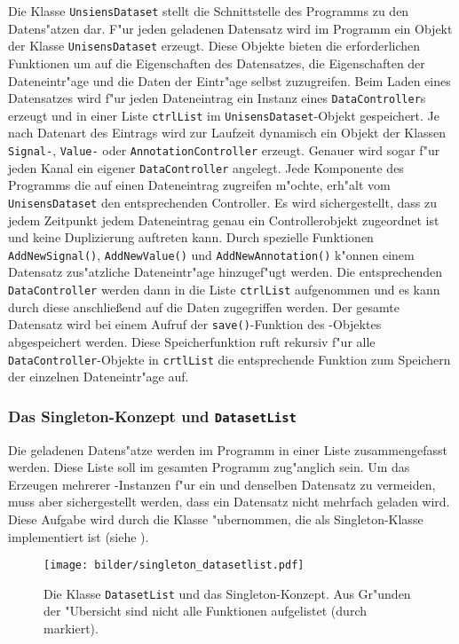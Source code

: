 Die Klasse \verb|UnsiensDataset| stellt die Schnittstelle des Programms zu den Datens"atzen dar.
F"ur jeden geladenen Datensatz wird im Programm ein Objekt der Klasse \verb|UnisensDataset| erzeugt.
Diese Objekte bieten die erforderlichen Funktionen um auf die Eigenschaften des Datensatzes, die Eigenschaften der Dateneintr"age und die Daten der Eintr"age selbst zuzugreifen.
Beim Laden eines Datensatzes wird f"ur jeden Dateneintrag ein Instanz eines \verb|DataController|s erzeugt und in einer Liste \verb|ctrlList| im \verb|UnisensDataset|-Objekt gespeichert.
Je nach Datenart des Eintrags wird zur Laufzeit dynamisch ein Objekt der Klassen \verb|Signal-|, \verb|Value-| oder \verb|AnnotationController| erzeugt.
Genauer wird sogar f"ur jeden Kanal ein eigener \verb|DataController| angelegt.
Jede Komponente des Programms die auf einen Dateneintrag zugreifen m"ochte, erh"alt vom \verb|UnisensDataset| den entsprechenden Controller.
Es wird sichergestellt, dass zu jedem Zeitpunkt jedem Dateneintrag genau ein Controllerobjekt zugeordnet ist und keine Duplizierung auftreten kann.
Durch spezielle Funktionen \verb|AddNewSignal()|, \verb|AddNewValue()| und \verb|AddNewAnnotation()| k"onnen einem Datensatz zus"atzliche Dateneintr"age hinzugef"ugt werden.
Die entsprechenden \verb|DataController| werden dann in die Liste \verb|ctrlList| aufgenommen und es kann durch diese anschlie\ss end auf die Daten zugegriffen werden.
Der gesamte Datensatz wird bei einem Aufruf der \verb|save()|-Funktion des -Objektes abgespeichert werden.
Diese Speicherfunktion ruft rekursiv f"ur alle \verb|DataController|-Objekte in \verb|crtlList| die entsprechende Funktion  zum Speichern der einzelnen Dateneintr"age auf.

\subsubsection{Das Singleton-Konzept und \texttt{DatasetList}}
\label{sec:singleton}
\label{sec:datasetlist}

Die geladenen Datens"atze werden im Programm in einer Liste zusammengefasst werden.
Diese Liste soll im gesamten Programm zug"anglich sein.
Um das Erzeugen mehrerer -Instanzen f"ur ein und denselben Datensatz zu vermeiden, muss aber sichergestellt werden, dass ein Datensatz nicht mehrfach geladen wird.
Diese Aufgabe wird durch die Klasse  "ubernommen, die als Singleton-Klasse implementiert ist (siehe ).
\begin{figure}[htb]
\centering
\texttt{[image: bilder/singleton\_datasetlist.pdf]}
\caption[Klasse \texttt{DatasetList} und das Singleton-Konzept]{Die Klasse \texttt{DatasetList} und das Singleton-Konzept. Aus Gr"unden der "Ubersicht sind nicht alle Funktionen aufgelistet (durch  markiert).}
\label{pic:datasetlist}
\end{figure}

